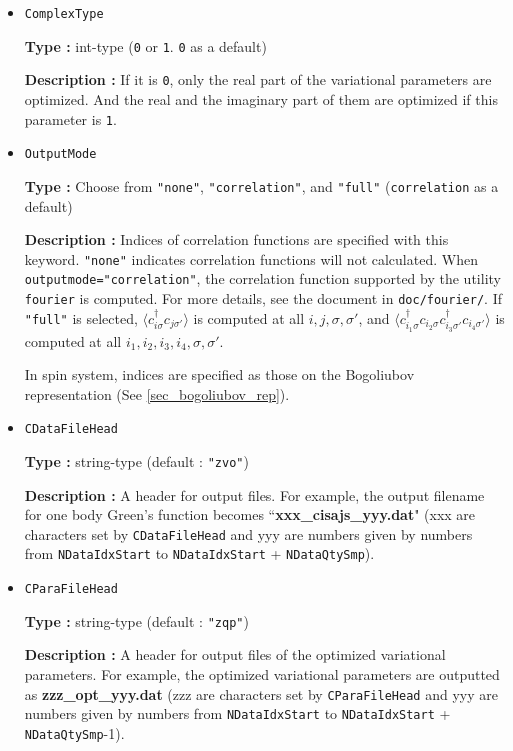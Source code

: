 \begin{itemize}
\item  \verb|ComplexType|
  
  {\bf Type :} int-type (\verb|0| or \verb|1|. \verb|0| as a default)

  {\bf Description :}
  If it is \verb|0|, only the real part of the variational parameters are optimized.
  And the real and the imaginary part of them are optimized if this parameter is \verb|1|.

\item \verb|OutputMode|

  {\bf Type :} Choose from \verb|"none"|, \verb|"correlation"|, and \verb|"full"|
  (\verb|correlation| as a default)

  {\bf Description :} Indices of correlation functions
  are specified with this keyword.
  \verb|"none"| indicates correlation functions will not calculated.
  When \verb|outputmode="correlation"|,
  the correlation function supported by the utility \verb|fourier| is computed.
  For more details, see the document in \verb|doc/fourier/|.
  If \verb|"full"| is selected,
  $\langle c_{i \sigma}^{\dagger}c_{j \sigma'} \rangle$ is computed at all $i, j, \sigma, \sigma'$,
  and
  $\langle c_{i_1 \sigma}^{\dagger}c_{i_2 \sigma} c_{i_3 \sigma'}^{\dagger}c_{i_4 \sigma'} \rangle$
  is computed at all $i_1, i_2, i_3, i_4, \sigma, \sigma'$.
  
  In spin system, 
  indices are specified as those on the Bogoliubov representation
  (See \ref{sec_bogoliubov_rep}).

  \item  \verb|CDataFileHead|

 {\bf Type :} string-type (default : \verb|"zvo"|)

{\bf Description :} A header for output files. For example, the output filename for one body Green's function becomes ``{\bf xxx\_cisajs\_yyy.dat}" (xxx are characters set by \verb|CDataFileHead| and yyy are numbers given by numbers from \verb|NDataIdxStart| to \verb|NDataIdxStart| +  \verb|NDataQtySmp|). 

 \item  \verb|CParaFileHead|

 {\bf Type :} string-type (default : \verb|"zqp"|)

{\bf Description :}  A header for output files of the optimized variational parameters. For example, the optimized variational parameters are outputted as  {\bf zzz\_opt\_yyy.dat} (zzz are characters set by \verb|CParaFileHead| and yyy are numbers given by numbers from \verb|NDataIdxStart| to \verb|NDataIdxStart| +  \verb|NDataQtySmp|-1).

\end{itemize}


